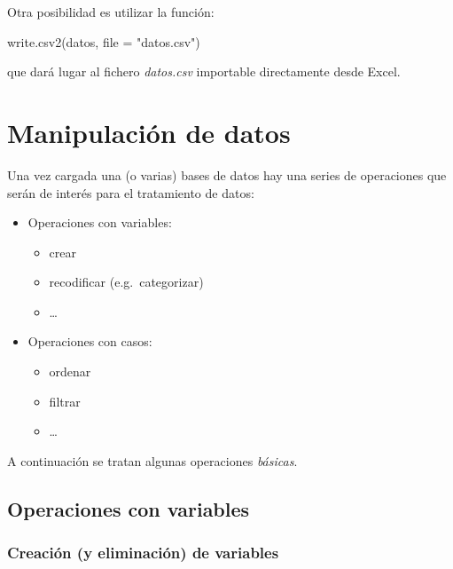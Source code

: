 \documentclass[
]{book}
\newenvironment{Shaded}{\begin{snugshade}}{\end{snugshade}}
\newcommand{\AttributeTok}[1]{\textcolor[rgb]{0.77,0.63,0.00}{#1}}
\newcommand{\FunctionTok}[1]{\textcolor[rgb]{0.00,0.00,0.00}{#1}}
\newcommand{\NormalTok}[1]{#1}
\newcommand{\StringTok}[1]{\textcolor[rgb]{0.31,0.60,0.02}{#1}}
\providecommand{\tightlist}{%
  \setlength{\itemsep}{0pt}\setlength{\parskip}{0pt}}
\theoremstyle{break}
\begin{document}
Otra posibilidad es utilizar la función:

\begin{Shaded}
\begin{Highlighting}[]
\FunctionTok{write.csv2}\NormalTok{(datos, }\AttributeTok{file =} \StringTok{"datos.csv"}\NormalTok{)}
\end{Highlighting}
\end{Shaded}

que dará lugar al fichero \emph{datos.csv} importable directamente desde Excel.

\hypertarget{manipulaciuxf3n-de-datos}{%
\section{Manipulación de datos}\label{manipulaciuxf3n-de-datos}}

Una vez cargada una (o varias) bases
de datos hay una series de operaciones que serán de interés para el
tratamiento de datos:

\begin{itemize}
\tightlist
\item
  Operaciones con variables:

  \begin{itemize}
  \tightlist
  \item
    crear
  \item
    recodificar (e.g.~categorizar)
  \item
    \ldots{}
  \end{itemize}
\item
  Operaciones con casos:

  \begin{itemize}
  \tightlist
  \item
    ordenar
  \item
    filtrar
  \item
    \ldots{}
  \end{itemize}
\end{itemize}

A continuación se tratan algunas operaciones \emph{básicas}.

\hypertarget{operaciones-con-variables}{%
\subsection{Operaciones con variables}\label{operaciones-con-variables}}

\hypertarget{creaciuxf3n-y-eliminaciuxf3n-de-variables}{%
\subsubsection{Creación (y eliminación) de variables}\label{creaciuxf3n-y-eliminaciuxf3n-de-variables}}
\end{document}
